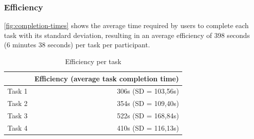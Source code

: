 \subsubsection*{Efficiency}
\autoref{fig:completion-times} shows the average time required by users to complete each task with its standard deviation, resulting in an average efficiency of 398 seconds (6 minutes 38 seconds) per task per participant.
\begin{table}[h]
\centering
\begin{tabular}{lr}
\hline
       & \multicolumn{1}{l}{Efficiency (average task completion time)} \\ \hline
Task 1 & 306s (SD = 103,56s)                                           \\
Task 2 & 354s (SD = 109,40s)                                           \\
Task 3 & 522s (SD = 168,84s)                                           \\
Task 4 & 410s (SD = 116,13s)                                           \\ \hline
\end{tabular}
\caption{Efficiency per task}
\label{tab:avg-efficiency}
\end{table}

